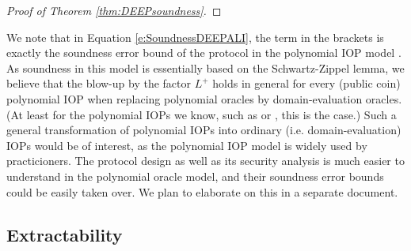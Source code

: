 \documentclass[11pt,article,oneside]{memoir}
\theoremstyle{definition}
\theoremstyle{remark}
\begin{document}
\begin{proof}[Proof of Theorem \ref{thm:DEEPsoundness}]
\end{proof}

We note that in Equation \eqref{e:SoundnessDEEPALI}, the term in the brackets is exactly the soundness error bound of the protocol in the polynomial IOP model \cite{DARK}.
As soundness in this model is essentially based on the Schwartz-Zippel lemma, we believe that the blow-up by the factor $L^+$ holds in general for every (public coin) polynomial IOP when replacing polynomial oracles by domain-evaluation oracles. 
(At least for the polynomial IOPs we know, such as \cite{Plonk, Sonic, Marlin} or \cite{Darlin}, this is the case.)
Such a general transformation of polynomial IOPs into ordinary (i.e. domain-evaluation) IOPs would be of interest, as the polynomial IOP model is widely used by practicioners.   
The protocol design as well as its security analysis is much easier to understand in the polynomial oracle model, and their soundness error bounds could be easily taken over.
We plan to elaborate on this in a separate document.


\subsection{Extractability}
\end{document}
